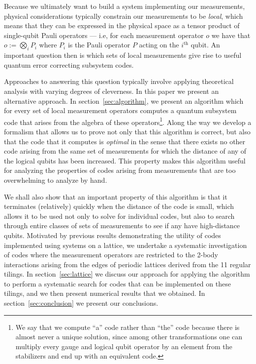 \documentclass[twocolumn,showpacs,preprintnumbers,amsmath,amssymb,nofootinbib,pra,floatfix]{revtex4-1}
\begin{document}
Because we ultimately want to build a system implementing our measurements, physical considerations typically constrain our measurements to be \emph{local}, which means that they can be expressed in the physical space as a tensor product of single-qubit Pauli operators --- i.e, for each measurement operator $o$ we have that
$o := \bigotimes_i P_i$ where $P_i$ is the Pauli operator $P$ acting on the $i^{\text{th}}$ qubit.  An important question then is which sets of local measurements give rise to useful quantum error correcting subsystem codes.

Approaches to answering this question typically involve applying theoretical analysis with varying degrees of cleverness.  In this paper we present an alternative approach.  In section~\ref{sec:algorithm}, we present an algorithm which for every set of local measurement operators computes a quantum subsystem code that arises from the algebra of these operators\footnote{We say that we compute ``a'' code rather than ``the'' code because there is almost never a unique solution, since among other transformations one can multiply every gauge and logical qubit operator by an element from the stabilizers and end up with an equivalent code.}.  Along the way we develop a formalism that allows us to prove not only that this algorithm is correct, but also that the code that it computes is \emph{optimal} in the sense that there exists no other code arising from the same set of measurements for which the distance of any of the logical qubits has been increased.  This property makes this algorithm useful for analyzing the properties of codes arising from measurements that are too overwhelming to analyze by hand.  

We shall also show that an important property of this algorithm is that it terminates (relatively) quickly when the distance of the code is small, which allows it to be used not only to solve for individual codes, but also to search through entire classes of sets of measurements to see if any have high-distance qubits.  Motivated by previous results demonstrating the utility of codes implemented using systems on a lattice, we undertake a systematic investigation of codes where the measurement operators are restricted to the 2-body interactions arising from the edges of periodic lattices derived from the 11 regular tilings.  In section~\ref{sec:lattice} we discuss our approach for applying the algorithm to perform a systematic search for codes that can be implemented on these tilings, and we then present numerical results that we obtained. In section~\ref{sec:conclusion} we present our conclusions.
\end{document}
